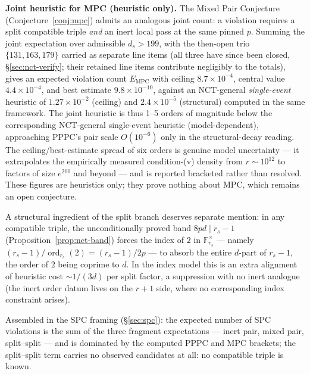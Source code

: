 \documentclass[11pt]{amsart}
\theoremstyle{plain}
\theoremstyle{definition}
\theoremstyle{remark}
\numberwithin{equation}{section}
\newcommand{\ord}{\operatorname{ord}}
\newcommand{\F}{\mathbb{F}}
\begin{document}
\textbf{Joint heuristic for MPC (heuristic only).} The Mixed Pair Conjecture (Conjecture~\ref{conj:mpc}) admits an analogous joint count: a violation requires a split compatible triple \emph{and} an inert local pass at the same pinned $p$. Summing the joint expectation over admissible $d_s > 199$, with the then-open trio $\{131, 163, 179\}$ carried as separate line items (all three have since been closed, \S\ref{sec:nct-verify}; their retained line items contribute negligibly to the totals), gives an expected violation count $E_{\mathrm{MPC}}$ with ceiling $8.7 \times 10^{-4}$, central value $4.4 \times 10^{-4}$, and best estimate $9.8 \times 10^{-10}$, against an NCT-general \emph{single-event} heuristic of $1.27 \times 10^{-2}$ (ceiling) and $2.4 \times 10^{-5}$ (structural) computed in the same framework. The joint heuristic is thus 1--5 orders of magnitude below the corresponding NCT-general single-event heuristic (model-dependent), approaching PPPC's pair scale $O(10^{-6})$ only in the structural-decay reading. The ceiling/best-estimate spread of six orders is genuine model uncertainty --- it extrapolates the empirically measured condition-(v) density from $r \sim 10^{12}$ to factors of size $e^{200}$ and beyond --- and is reported bracketed rather than resolved. These figures are heuristics only; they prove nothing about MPC, which remains an open conjecture.

A structural ingredient of the split branch deserves separate mention: in any compatible triple, the unconditionally proved band $8 p d \mid r_s - 1$ (Proposition~\ref{prop:nct-band}) forces the index of $2$ in $\F_{r_s}^\times$ --- namely $(r_s - 1)/\ord_{r_s}(2) = (r_s - 1)/2p$ --- to absorb the entire $d$-part of $r_s - 1$, the order of $2$ being coprime to $d$. In the index model this is an extra alignment of heuristic cost $\sim 1/(3d)$ per split factor, a suppression with no inert analogue (the inert order datum lives on the $r + 1$ side, where no corresponding index constraint arises).

Assembled in the SPC framing (\S\ref{sec:spc}): the expected number of SPC violations is the sum of the three fragment expectations --- inert pair, mixed pair, split--split --- and is dominated by the computed PPPC and MPC brackets; the split--split term carries no observed candidates at all: no compatible triple is known.
\end{document}
